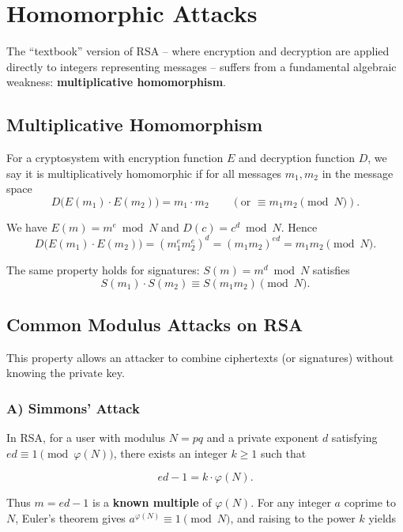 \section{Homomorphic Attacks}
The ``textbook'' version of RSA -- where encryption and decryption are applied directly to integers representing messages -- suffers from a fundamental algebraic weakness: \textbf{multiplicative homomorphism}.

\subsection*{ Multiplicative Homomorphism}

\begin{definition}
For a cryptosystem with encryption function \(E\) and decryption function \(D\), we say it is multiplicatively homomorphic if for all messages \(m_1, m_2\) in the message space
\[
D\bigl( E(m_1) \cdot E(m_2) \bigr) = m_1 \cdot m_2 \qquad (\text{or } \equiv m_1 m_2 \pmod{N}).
\]
\end{definition}

 We have \(E(m) = m^e \bmod N\) and \(D(c) = c^d \bmod N\). Hence
\[
D\bigl( E(m_1) \cdot E(m_2) \bigr) = (m_1^e m_2^e)^d = (m_1 m_2)^{ed} = m_1 m_2 \pmod{N}.
\]

The same property holds for signatures: \(S(m) = m^d \bmod N\) satisfies
\[
S(m_1) \cdot S(m_2) \equiv S(m_1 m_2) \pmod{N}.
\]

\subsection{Common Modulus Attacks on RSA}
This property allows an attacker to combine ciphertexts (or signatures) without knowing the private key.

\subsubsection*{A) Simmons’ Attack}

In RSA, for a user with modulus \(N = pq\) and a private exponent \(d\) satisfying \(ed \equiv 1 \pmod{\varphi(N)}\), there exists an integer \(k \ge 1\) such that  

\[
ed - 1 = k \cdot \varphi(N). 
\]

Thus \(m = ed - 1\) is a \textbf{known multiple} of \(\varphi(N)\). For any integer \(a\) coprime to \(N\), Euler’s theorem gives \(a^{\varphi(N)} \equiv 1 \pmod{N}\), and raising to the power \(k\) yields  

